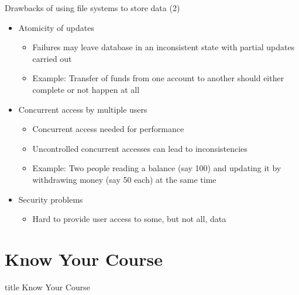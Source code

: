\documentclass[aspectratio=169, xcolor=dvipsnames]{beamer}
\begin{document}
\begin{frame}{Drawbacks of using file systems to store data (2)}
    \begin{itemize}[<+->]
        \item Atomicity of updates
        \begin{itemize}
            \item Failures may leave database in an inconsistent state with partial updates carried out
            \item Example: Transfer of funds from one account to another should either complete or not happen at all
        \end{itemize}
        \item Concurrent access by multiple users
        \begin{itemize}
            \item Concurrent access needed for performance
            \item Uncontrolled concurrent accesses can lead to inconsistencies
            \item Example: Two people reading a balance (say 100) and updating it by withdrawing money (say 50 each) at the same time
        \end{itemize}
        \item Security problems
        \begin{itemize}
            \item Hard to provide user access to some, but not all, data
        \end{itemize}
    \end{itemize}
    
\end{frame}

\section{Know Your Course}

\begin{frame}
  \vfill
  \centering
  \begin{beamercolorbox}[sep=8pt,center,shadow=true,rounded=true]{title}
    Know Your Course\par%
  \end{beamercolorbox}
  \vfill
\end{frame}
\end{document}
